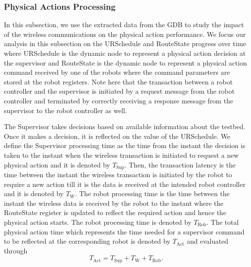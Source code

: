 
\subsubsection{Physical Actions Processing}
In this subsection, we use the extracted data from the GDB to study the impact of the wireless communications on the physical action performance. We focus our analysis in this subsection on the URSchedule and RouteState progress over time where URSchedule is the dynamic node to represent a physical action decision at the supervisor and RouteState is the dynamic node to represent a physical action command received by one of the robots where the command parameters are stored at the robot registers. Note here that the transaction between a robot controller and the supervisor is initiated by a request message from the robot controller and terminated by correctly receiving a response message from the supervisor to the robot controller as well. 

The Supervisor takes decisions based on available information about the testbed. Once it makes a decision, it is reflected on the value of the URSchedule. We define the Supervisor processing time as the time from the instant the decision is taken to the instant when the wireless transaction is initiated to request a new physical action and it is denoted by $T_\text{Sup}$. Then, the transaction latency is the time between the instant the wireless transaction is initiated by the robot to require a new action till it is the data is received at the intended robot controller and it is denoted by $T_\text{W}$. The robot processing time is the time between the instant the wireless data is received by the robot to the instant where the RouteState register is updated to reflect the required action and hence the physical action starts. The robot processing time is denoted by  $T_\text{Rob}$.  
The total physical action time which represents the time needed for a supervisor command to be reflected at the corresponding robot is denoted by $T_\text{Act}$ and evaluated through
\begin{equation}
T_\text{Act}=T_\text{Sup}+T_\text{W}+T_\text{Rob}.
\end{equation}

